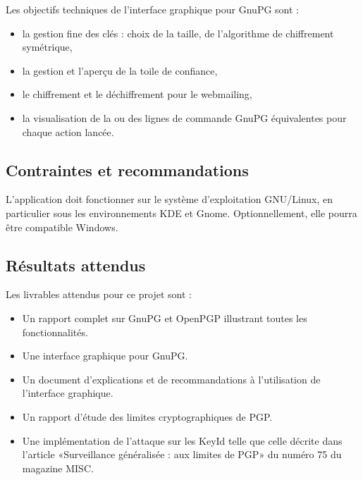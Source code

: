 \documentclass{../res/univ-projet}
\begin{document}
Les objectifs techniques de l'interface graphique pour GnuPG sont :
\begin{itemize}
 \item la gestion fine des clés : choix de la taille, de l'algorithme de chiffrement symétrique,
 \item la gestion et l'aperçu de la toile de confiance,
 \item le chiffrement et le déchiffrement pour le webmailing,
 \item la visualisation de la ou des lignes de commande GnuPG équivalentes pour chaque action lancée.
\end{itemize}

\subsection{Contraintes et recommandations}

L'application doit fonctionner sur le système d'exploitation GNU/Linux, en particulier sous les environnements KDE et Gnome. Optionnellement, elle pourra être compatible Windows.

\subsection{Résultats attendus}
Les livrables attendus pour ce projet sont :
\begin{itemize}
 \item Un rapport complet sur GnuPG et OpenPGP illustrant toutes les fonctionnalités.
 \item Une interface graphique pour GnuPG.
 \item Un document d'explications et de recommandations à l'utilisation de l'interface graphique.
 \item Un rapport d'étude des limites cryptographiques de PGP.
 \item Une implémentation de l'attaque sur les KeyId telle que celle décrite dans l'article «Surveillance généralisée : aux limites de PGP» du numéro 75 du magazine MISC.
\end{itemize}
\end{document}
